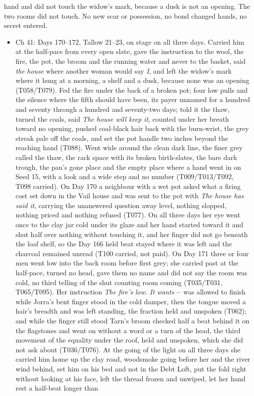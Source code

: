 \documentclass{design/chronicle}
\begin{document}
{\begin{itemize}[leftmargin=1.4em,itemsep=1pt,topsep=3pt,parsep=0pt]
hand and did not touch the widow’s mark, because a dusk is not an opening. The two rooms did not touch. No new scar or possession, no bond changed hands, no secret entered.

\end{itemize}

\begin{itemize}[leftmargin=1.4em,itemsep=1pt,topsep=3pt,parsep=0pt]

\item Ch 41: Days 170–172, Tallow 21–23, on stage on all three days. Carried him at the half-pace from every open slate, gave the instruction to the wool, the fire, the pot, the broom and the running water and never to the basket, said \emph{the house} where another woman would say \emph{I}, and left the widow’s mark where it hung at a morning, a shelf and a dusk, because none was an opening (T058/T079). Fed the fire under the back of a broken pot; four low pulls and the silence where the fifth should have been, its payer unnamed for a hundred and seventy through a hundred and seventy-two days; told it the thaw, turned the coals, said \emph{The house will keep it}, counted under her breath toward no opening, pushed coal-black hair back with the burn-wrist, the grey streak pale off the coals, and set the pot handle two inches beyond the reaching hand (T088). Went wide around the clean dark line, the finer grey called the thaw, the rack space with its broken birth-slates, the bare dark trough, the pan’s gone place and the empty place where a hand went in on Seed 15, with a look and a wide step and no number (T009/T013/T092, T098 carried). On Day 170 a neighbour with a wet pot asked what a firing cost set down in the Vail house and was sent to the pot with \emph{The house has said it}, carrying the unanswered question away level, nothing slopped, nothing priced and nothing refused (T077). On all three days her eye went once to the clay jar cold under its glaze and her hand started toward it and shut half over nothing without touching it, and her finger did not go beneath the loaf shelf, so the Day 166 held beat stayed where it was left and the charcoal remained unread (T100 carried, not paid). On Day 171 three or four men went low into the back room before first grey; she carried past at the half-pace, turned no head, gave them no name and did not say the room was cold, no third telling of the shut counting room coming (T035/T031, T065/T095). Her instruction \emph{The fire’s low. It wants---} was allowed to finish while Jorra’s bent finger stood in the cold damper, then the tongue moved a hair’s breadth and was left standing, the fraction held and unspoken (T062); and while the finger still stood Tarn’s broom checked half a beat behind it on the flagstones and went on without a word or a turn of the head, the third movement of the equality under the roof, held and unspoken, which she did not ask about (T036/T076). At the going of the light on all three days she carried him home up the clay road, woodsmoke going before her and the river wind behind, set him on his bed and not in the Debt Loft, put the fold right without looking at his face, left the thread frozen and unwiped, let her hand rest a half-beat longer than 
\end{itemize}}
\end{document}
